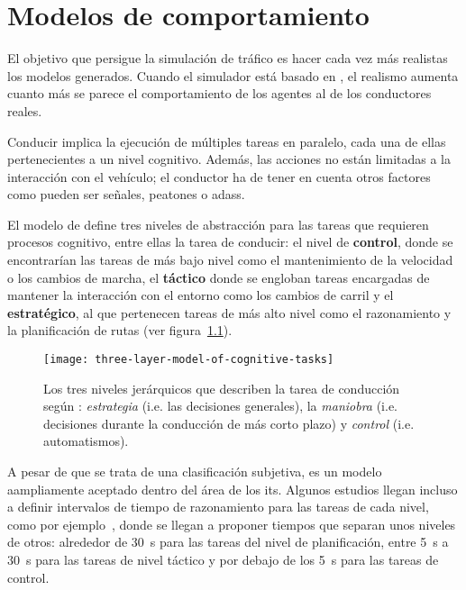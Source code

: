 \chapter{Modelos de comportamiento}
\label{ch:sota-behavior-models}

El objetivo que persigue la simulación de tráfico es hacer cada vez más realistas los modelos generados. Cuando el simulador está basado en , el realismo aumenta cuanto más se parece el comportamiento de los agentes al de los conductores reales.

Conducir implica la ejecución de múltiples tareas en paralelo, cada una de ellas pertenecientes a un nivel cognitivo. Además, las acciones no están limitadas a la interacción con el vehículo; el conductor ha de tener en cuenta otros factores como pueden ser señales, peatones o \glspl{adas}.

El modelo de \cite{michon1985critical} define tres niveles de abstracción para las tareas que requieren procesos cognitivo, entre ellas la tarea de conducir: el nivel de \textbf{control}, donde se encontrarían las tareas de más bajo nivel como el mantenimiento de la velocidad o los cambios de marcha, el \textbf{táctico} donde se engloban tareas encargadas de mantener la interacción con el entorno como los cambios de carril y el \textbf{estratégico}, al que pertenecen tareas de más alto nivel como el razonamiento y la planificación de rutas (ver figura~\ref{fig:three-levels-of-human-driving}).

\begin{figure}
	\centering
	\texttt{[image: three-layer-model-of-cognitive-tasks]}
	\caption[Los tres niveles jerárquicos de conducción según \cite{michon1985critical}]{Los tres niveles jerárquicos que describen la tarea de conducción según \cite{michon1985critical}: \textit{estrategia} (i.e. las decisiones generales), la \textit{maniobra} (i.e. decisiones durante la conducción de más corto plazo) y \textit{control} (i.e. automatismos).}
	\label{fig:three-levels-of-human-driving}
\end{figure}

A pesar de que se trata de una clasificación subjetiva, es un modelo aampliamente aceptado dentro del área de los \gls{its}. Algunos estudios llegan incluso a definir intervalos de tiempo de razonamiento para las tareas de cada nivel, como por ejemplo~\cite{Alexiadis2004}, donde se llegan a proponer tiempos que separan unos niveles de otros: alrededor de \SI{30}{\second} para las tareas del nivel de planificación, entre \SI{5}{\second} a \SI{30}{\second} para las tareas de nivel táctico y por debajo de los \SI{5}{\second} para las tareas de control.

